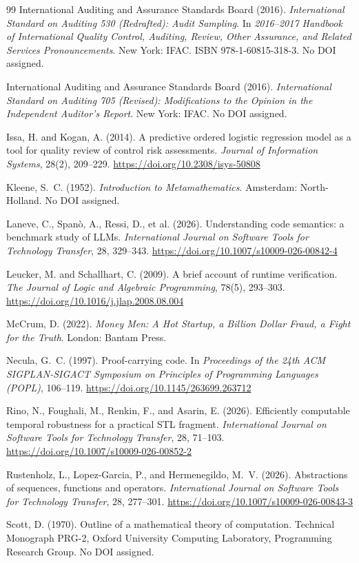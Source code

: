 \documentclass[smallcondensed,envcountsect,natbib]{svjour3}
\begin{document}
\begin{thebibliography}{99}
International Auditing and Assurance Standards Board (2016).
\emph{International Standard on Auditing 530 (Redrafted): Audit Sampling}.
In \emph{2016--2017 Handbook of International Quality Control, Auditing, Review, Other Assurance, and Related Services Pronouncements}. New York: IFAC. ISBN 978-1-60815-318-3. No DOI assigned.

International Auditing and Assurance Standards Board (2016).
\emph{International Standard on Auditing 705 (Revised): Modifications to the Opinion in the Independent Auditor's Report}.
New York: IFAC. No DOI assigned.

Issa, H. and Kogan, A. (2014).
A predictive ordered logistic regression model as a tool for quality review of control risk assessments.
\emph{Journal of Information Systems}, 28(2), 209--229. \url{https://doi.org/10.2308/isys-50808}

Kleene, S.~C. (1952).
\emph{Introduction to Metamathematics}.
Amsterdam: North-Holland. No DOI assigned.

Laneve, C., Span\`o, A., Ressi, D., et al. (2026).
Understanding code semantics: a benchmark study of LLMs.
\emph{International Journal on Software Tools for Technology Transfer}, 28, 329--343. \url{https://doi.org/10.1007/s10009-026-00842-4}

Leucker, M. and Schallhart, C. (2009).
A brief account of runtime verification.
\emph{The Journal of Logic and Algebraic Programming}, 78(5), 293--303. \url{https://doi.org/10.1016/j.jlap.2008.08.004}

McCrum, D. (2022).
\emph{Money Men: A Hot Startup, a Billion Dollar Fraud, a Fight for the Truth}.
London: Bantam Press.

Necula, G.~C. (1997).
Proof-carrying code.
In \emph{Proceedings of the 24th ACM SIGPLAN-SIGACT Symposium on Principles of Programming Languages (POPL)}, 106--119. \url{https://doi.org/10.1145/263699.263712}

Rino, N., Foughali, M., Renkin, F., and Asarin, E. (2026).
Efficiently computable temporal robustness for a practical STL fragment.
\emph{International Journal on Software Tools for Technology Transfer}, 28, 71--103. \url{https://doi.org/10.1007/s10009-026-00852-2}

Rustenholz, L., Lopez-Garcia, P., and Hermenegildo, M.~V. (2026).
Abstractions of sequences, functions and operators.
\emph{International Journal on Software Tools for Technology Transfer}, 28, 277--301. \url{https://doi.org/10.1007/s10009-026-00843-3}

Scott, D. (1970).
Outline of a mathematical theory of computation.
Technical Monograph PRG-2, Oxford University Computing Laboratory, Programming Research Group. No DOI assigned.

\end{thebibliography}
\end{document}
